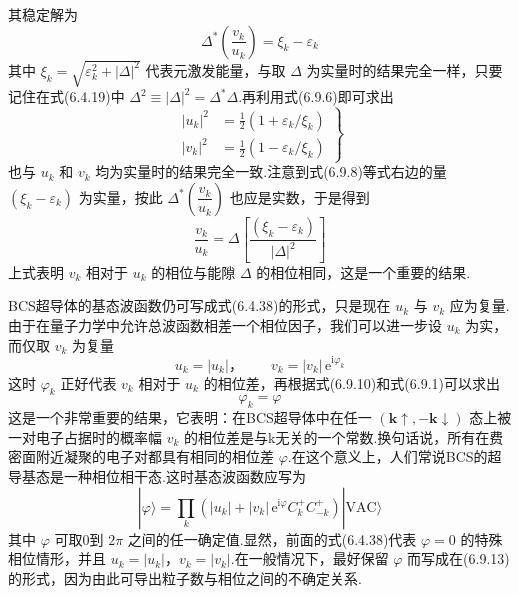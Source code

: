 其稳定解为
\begin{equation}
  \Delta^{*}\left(\frac{v_{k}}{u_{k}}\right)=\xi_{k}-\varepsilon_{k}
\end{equation}
其中 $\xi_{k}=\sqrt{\varepsilon_{k}^{2}+|\Delta|^{2}}$ 代表元激发能量，与取 $\Delta$ 为实量时的结果完全一样，只要记住在式(6.4.19)中 $\Delta^{2}\equiv|\Delta|^{2}=\Delta^{*}\Delta$.再利用式(6.9.6)即可求出
\begin{equation}
  \left.
  \begin{aligned}
    |u_{k}|^{2}&=\frac{1}{2}\left(1+\varepsilon_{k}/\xi_{k}\right)\\
    |v_{k}|^{2}&=\frac{1}{2}\left(1-\varepsilon_{k}/\xi_{k}\right)
  \end{aligned}\right\}
\end{equation}
也与 $u_{k}$ 和 $v_{k}$ 均为实量时的结果完全一致.注意到式(6.9.8)等式右边的量 $\left(\xi_{k}-\varepsilon_{k}\right)$ 为实量，按此 $\Delta^{*}\left(\dfrac{v_{k}}{u_{k}}\right)$ 也应是实数，于是得到
\begin{equation}
  \frac{v_{k}}{u_{k}}
  =\Delta\left[\frac{\left(\xi_{k}-\varepsilon_{k}\right)}{|\Delta|^{2}}\right]
\end{equation}
上式表明 $v_{k}$ 相对于 $u_{k}$ 的相位与能隙 $\Delta$ 的相位相同，这是一个重要的结果.

BCS超导体的基态波函数仍可写成式(6.4.38)的形式，只是现在 $u_{k}$ 与 $v_{k}$ 应为复量.由于在量子力学中允许总波函数相差一个相位因子，我们可以进一步设 $u_{k}$ 为实，而仅取 $v_{k}$ 为复量
\begin{equation}
  u_{k}=|u_{k}|\text{，}
  \qquad v_{k}=|v_{k}|\,\mathrm{e}^{\mathrm{i}\varphi_{k}}
\end{equation}
这时 $\varphi_{k}$ 正好代表 $v_{k}$ 相对于 $u_{k}$ 的相位差，再根据式(6.9.10)和式(6.9.1)可以求出
\begin{equation}
  \varphi_{k}=\varphi
\end{equation}
这是一个非常重要的结果，它表明：在BCS超导体中在任一 $(\boldsymbol{k}\uparrow,-\boldsymbol{k}\downarrow)$ 态上被一对电子占据时的概率幅 $v_{k}$ 的相位差是与k无关的一个常数.换句话说，所有在费密面附近凝聚的电子对都具有相同的相位差 $\varphi$.在这个意义上，人们常说BCS的超导基态是一种相位相干态.这时基态波函数应写为
\begin{equation}
  |\varphi\rangle=\prod_{k}
  \left(|u_{k}|+|v_{k}|\,\mathrm{e}^{\mathrm{i}\varphi}
  C^{+}_{k}C^{+}_{-k}\right)|\mathrm{VAC}\rangle
\end{equation}
其中 $\varphi$ 可取0到 $2\pi$ 之间的任一确定值.显然，前面的式(6.4.38)代表 $\varphi=0$ 的特殊相位情形，并且 $u_{k}=|u_{k}|$，$v_{k}=|v_{k}|$.在一般情况下，最好保留 $\varphi$ 而写成在(6.9.13)的形式，因为由此可导出粒子数与相位之间的不确定关系.

